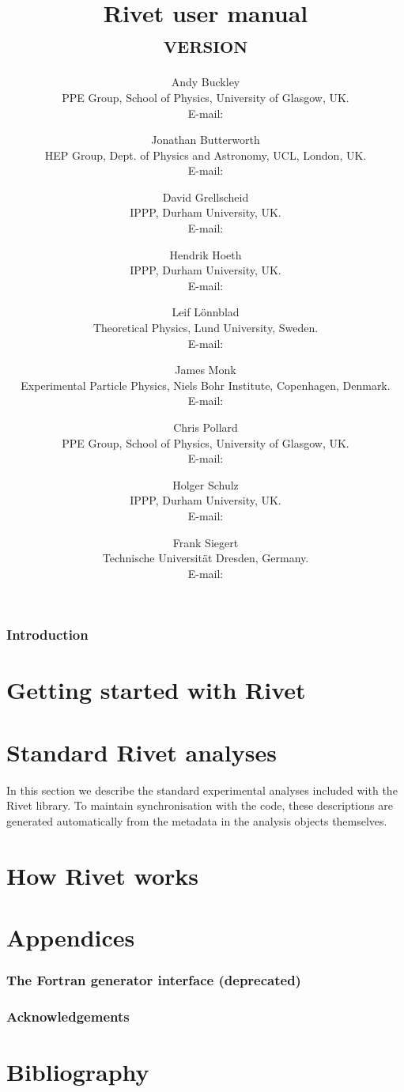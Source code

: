 \documentclass{JHEP3}
\title{Rivet user manual\\ {\smaller \textsc{version \RivetVersion}}}
\author{Andy Buckley\\ PPE Group, School of Physics, University of Glasgow, UK.\\ E-mail: \email{andy.buckley@cern.ch}}
\author{Jonathan Butterworth\\ HEP Group, Dept. of Physics and Astronomy, UCL, London, UK.\\ E-mail: \email{J.Butterworth@ucl.ac.uk}}
\author{David Grellscheid\\ IPPP, Durham University, UK.\\ E-mail: \email{david.grellscheid@durham.ac.uk}}
\author{Hendrik Hoeth\\ IPPP, Durham University, UK.\\ E-mail: \email{hendrik.hoeth@cern.ch}}
\author{Leif L\"onnblad\\ Theoretical Physics, Lund University, Sweden.\\ E-mail: \email{lonnblad@thep.lu.se}}
\author{James Monk\\ Experimental Particle Physics, Niels Bohr Institute, Copenhagen, Denmark.\\ E-mail: \email{jmonk@cern.ch}}
\author{Chris Pollard\\ PPE Group, School of Physics, University of Glasgow, UK.\\ E-mail: \email{cpollard@cern.ch}}
\author{Holger Schulz\\ IPPP, Durham University, UK.\\ E-mail: \email{holger.schulz@durham.ac.uk}}
\author{Frank Siegert\\ Technische Universit\"at Dresden, Germany.\\ E-mail: \email{frank.siegert@cern.ch}}
\begin{document}
\section{Introduction}
\label{sec:intro}


\cleardoublepage

\part{Getting started with Rivet}
\label{part:gettingstarted}


\cleardoublepage

\part{Standard Rivet analyses}
\label{part:analyses}
In this section we describe the standard experimental analyses included with the
Rivet library. To maintain synchronisation with the code, these descriptions are
generated automatically from the metadata in the analysis objects
themselves.


\cleardoublepage

\part{How Rivet works}
\label{part:writinganalyses}


\cleardoublepage

\part{Appendices}
\appendix

\section{The  Fortran generator interface (deprecated)}
\label{app:agilerunmc}



\section{Acknowledgements}
\label{app:acknowledgements}



\cleardoublepage

\part{Bibliography}

{\raggedright
  
}
\end{document}
